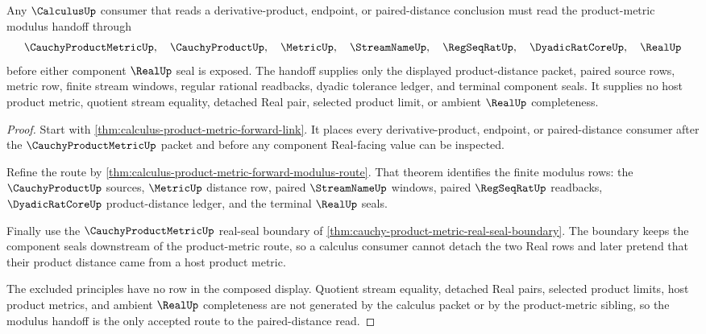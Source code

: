 \begin{theorem}
\label{thm:calculus-product-metric-modulus-handoff}
Any $\CalculusUp$ consumer that reads a derivative-product, endpoint, or paired-distance conclusion must read the product-metric modulus handoff through
$$
\CauchyProductMetricUp,\quad
\CauchyProductUp,\quad
\MetricUp,\quad
\StreamNameUp,\quad
\RegSeqRatUp,\quad
\DyadicRatCoreUp,\quad
\RealUp
$$
before either component $\RealUp$ seal is exposed. The handoff supplies only the displayed product-distance packet, paired source rows, metric row, finite stream windows, regular rational readbacks, dyadic tolerance ledger, and terminal component seals. It supplies no host product metric, quotient stream equality, detached Real pair, selected product limit, or ambient $\RealUp$ completeness.
\end{theorem}
\begin{proof}
Start with \autoref{thm:calculus-product-metric-forward-link}. It places every derivative-product, endpoint, or paired-distance consumer after the $\CauchyProductMetricUp$ packet and before any component Real-facing value can be inspected.

Refine the route by \autoref{thm:calculus-product-metric-forward-modulus-route}. That theorem identifies the finite modulus rows: the $\CauchyProductUp$ sources, $\MetricUp$ distance row, paired $\StreamNameUp$ windows, paired $\RegSeqRatUp$ readbacks, $\DyadicRatCoreUp$ product-distance ledger, and the terminal $\RealUp$ seals.

Finally use the $\CauchyProductMetricUp$ real-seal boundary of \autoref{thm:cauchy-product-metric-real-seal-boundary}. The boundary keeps the component seals downstream of the product-metric route, so a calculus consumer cannot detach the two Real rows and later pretend that their product distance came from a host product metric.

The excluded principles have no row in the composed display. Quotient stream equality, detached Real pairs, selected product limits, host product metrics, and ambient $\RealUp$ completeness are not generated by the calculus packet or by the product-metric sibling, so the modulus handoff is the only accepted route to the paired-distance read.
\end{proof}

